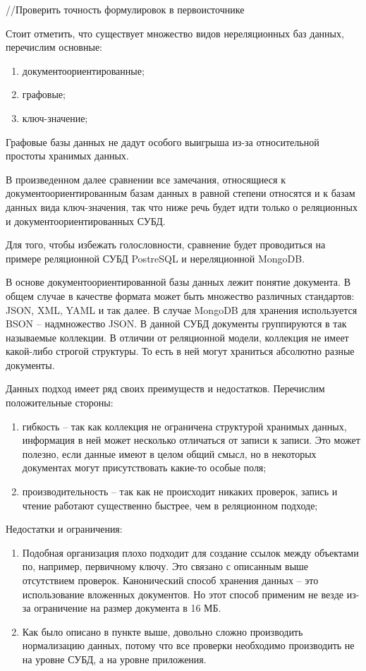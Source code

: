 //Проверить точность формулировок в первоисточнике

Стоит отметить, что существует множество видов нереляционных баз данных, перечислим
основные:

\begin{enumerate}
    \item документоориентированные;
    \item графовые;
    \item ключ-значение;
\end{enumerate}

Графовые базы данных не дадут особого выигрыша из-за относительной простоты хранимых данных.

В произведенном далее сравнении все замечания, относящиеся к документоориентированным базам данных
в равной степени относятся и к базам данных вида ключ-значения, так что ниже речь будет идти
только о реляционных и документоориентированных СУБД.

Для того, чтобы избежать голословности, сравнение будет проводиться на примере реляционной СУБД PostreSQL и 
нереляционной MongoDB.

В основе документоориентированной базы данных лежит понятие документа. В общем случае в качестве формата
может быть множество различных стандартов: JSON, XML, YAML и так далее. В случае MongoDB для хранения
используется BSON -- надмножество JSON. В данной СУБД документы группируются в так называемые
коллекции. В отличии от реляционной модели, коллекция не имеет какой-либо строгой структуры. То есть
в ней могут храниться абсолютно разные документы.

Данных подход имеет ряд своих преимуществ и недостатков. Перечислим положительные стороны:

\begin{enumerate}
    \item гибкость -- так как коллекция не ограничена структурой хранимых данных, информация
        в ней может несколько отличаться от записи к записи. Это может полезно, если
        данные имеют в целом общий смысл, но в некоторых документах могут присутствовать
        какие-то особые поля;
    \item производительность -- так как не происходит никаких проверок, запись и чтение
        работают существенно быстрее, чем в реляционном подходе;
\end{enumerate}

Недостатки и ограничения:

\begin{enumerate}
    \item Подобная организация плохо подходит для создание ссылок между объектами по, например,
        первичному ключу. Это связано с описанным выше отсутствием проверок. Канонический
        способ хранения данных -- это использование вложенных документов. Но этот способ
        применим не везде из-за ограничение на размер документа в 16 МБ.
    \item Как было описано в пункте выше, довольно сложно производить нормализацию
        данных, потому что все проверки необходимо производить не на уровне СУБД, а
        на уровне приложения.
\end{enumerate}


